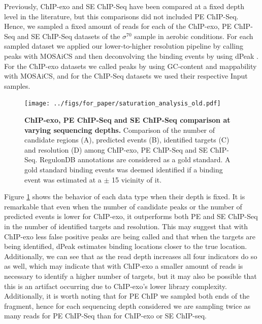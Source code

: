 \documentclass[11pt]{article}\usepackage[]{graphicx}\usepackage[]{color}
\begin{document}
Previously, ChIP-exo and SE ChIP-Seq have been compared at a fixed
depth level in the literature, but this comparisons did not included PE
ChIP-Seq. Hence, we sampled a fixed amount of reads for each of the
ChIP-exo, PE ChIP-Seq and SE ChIP-Seq datasets of the $\sigma^{70}$
sample in aerobic conditions. For each sampled dataset we applied our
lower-to-higher resolution pipeline by calling peaks with MOSAiCS
\cite{mosaics} and then deconvolving the binding events by using dPeak
\cite{dpeak}. For the ChIP-exo datasets we called peaks by using
GC-content and mappability with MOSAiCS, and for the ChIP-Seq datasets
we used their respective Input samples.

\begin{figure}[H]
  \centering
  \texttt{[image: ../figs/for\_paper/saturation\_analysis\_old.pdf]}
  \caption{\textbf{ChIP-exo, PE ChIP-Seq and SE ChIP-Seq comparison at
      varying sequencing depths.} Comparison of the number of candidate
    regions (A), predicted events (B), identified targets (C) and
    resolution (D) among ChIP-exo, PE ChIP-Seq and SE
    ChIP-Seq. RegulonDB annotations are considered as a gold
    standard. A gold standard binding events was deemed identified if
    a binding event was estimated at a $\pm$ 15 vicinity of
    it.}
  \label{fig:design}
\end{figure}

Figure \ref{fig:design} shows the behavior of each data type when
their depth is fixed. It is remarkable that even when the number of
candidate peaks or the number of predicted events is lower for
ChIP-exo, it outperforms both PE and SE ChIP-Seq in the number of
identified targets and resolution. This may suggest that with ChIP-exo
less false positive peaks are being called and that when the targets
are being identified, dPeak estimates binding locations closer to the
true location. Additionally, we can see that as the read depth
increases all four indicators do so as well, which may indicate that
with ChIP-exo a smaller amount of reads is necessary to identify a
higher number of targets, but it may also be possible that this is an
artifact occurring due to ChIP-exo's lower library
complexity. Additionally, it is worth noting that for PE ChIP we
sampled both ends of the fragment, hence for each sequencing depth
considered we are sampling twice as many reads for PE ChIP-Seq than
for ChIP-exo or SE ChIP-seq.

\end{document}

